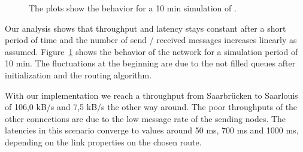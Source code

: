 {\begin{figure}[h]
   \caption[Analysis of milestone 2]{ The plots show the behavior for a 10 min simulation of .}
   
   \label{fig:analysis}
  \end{figure}

}{%

  Our analysis shows that throughput and latency stays constant after a short period of time and the number of send / received messages increases linearly as assumed. Figure~\ref{fig:analysis} shows the behavior of the  network for a simulation period of 10 min. The fluctuations at the beginning are due to the not filled queues after initialization and the routing algorithm.

  With our implementation we reach a throughput from Saarbrücken to Saarlouis of 106,0 kB/s and 7,5 kB/s the other way around. The poor throughputs of the other connections are due to the low message rate of the sending nodes. The latencies in this scenario converge to values around 50 ms, 700 ms and 1000 ms, depending on the link properties on the chosen route.
  
  \begin{figure}[h]
   \centering


\end{figure}}
